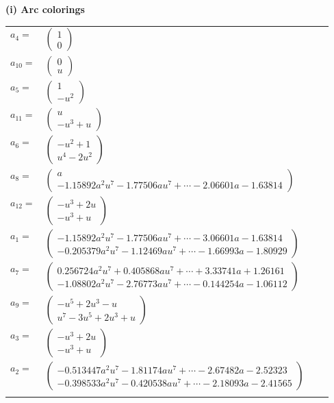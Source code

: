 \documentclass[1p]{elsarticle_modified}
\theoremstyle{definition}
\begin{document}
\flushleft \textbf{(i) Arc colorings}\\
\begin{tabular}{m{7pt} m{180pt} m{7pt} m{180pt} }
\flushright $a_{4}=$&$\begin{pmatrix}1\\0\end{pmatrix}$ \\
\flushright $a_{10}=$&$\begin{pmatrix}0\\u\end{pmatrix}$ \\
\flushright $a_{5}=$&$\begin{pmatrix}1\\- u^2\end{pmatrix}$ \\
\flushright $a_{11}=$&$\begin{pmatrix}u\\- u^3+u\end{pmatrix}$ \\
\flushright $a_{6}=$&$\begin{pmatrix}- u^2+1\\u^4-2 u^2\end{pmatrix}$ \\
\flushright $a_{8}=$&$\begin{pmatrix}a\\-1.15892 a^{2} u^{7}-1.77506 a u^{7}+\cdots-2.06601 a-1.63814\end{pmatrix}$ \\
\flushright $a_{12}=$&$\begin{pmatrix}- u^3+2 u\\- u^3+u\end{pmatrix}$ \\
\flushright $a_{1}=$&$\begin{pmatrix}-1.15892 a^{2} u^{7}-1.77506 a u^{7}+\cdots-3.06601 a-1.63814\\-0.205379 a^{2} u^{7}-1.12469 a u^{7}+\cdots-1.66993 a-1.80929\end{pmatrix}$ \\
\flushright $a_{7}=$&$\begin{pmatrix}0.256724 a^{2} u^{7}+0.405868 a u^{7}+\cdots+3.33741 a+1.26161\\-1.08802 a^{2} u^{7}-2.76773 a u^{7}+\cdots-0.144254 a-1.06112\end{pmatrix}$ \\
\flushright $a_{9}=$&$\begin{pmatrix}- u^5+2 u^3- u\\u^7-3 u^5+2 u^3+u\end{pmatrix}$ \\
\flushright $a_{3}=$&$\begin{pmatrix}- u^3+2 u\\- u^3+u\end{pmatrix}$ \\
\flushright $a_{2}=$&$\begin{pmatrix}-0.513447 a^{2} u^{7}-1.81174 a u^{7}+\cdots-2.67482 a-2.52323\\-0.398533 a^{2} u^{7}-0.420538 a u^{7}+\cdots-2.18093 a-2.41565\end{pmatrix}$\\&\end{tabular}
\end{document}

